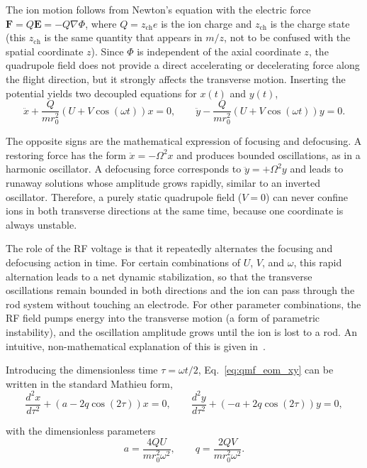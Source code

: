 \documentclass[a4paper]{article}
\begin{document}
The ion motion follows from Newton's equation with the electric force $\bm{F}=Q\bm{E}=-Q\nabla\Phi$, where $Q=z_{\mathrm{ch}}e$ is the ion charge and $z_{\mathrm{ch}}$ is the charge state (this $z_{\mathrm{ch}}$ is the same quantity that appears in $m/z$, not to be confused with the spatial coordinate $z$).
Since $\Phi$ is independent of the axial coordinate $z$, the quadrupole field does not provide a direct accelerating or decelerating force along the flight direction, but it strongly affects the transverse motion.
Inserting the potential yields two decoupled equations for $x(t)$ and $y(t)$,
\begin{equation}
  \ddot{x}+\frac{Q}{m r_0^2}\left(U+V\cos(\omega t)\right)x=0,
  \qquad
  \ddot{y}-\frac{Q}{m r_0^2}\left(U+V\cos(\omega t)\right)y=0.
  \label{eq:qmf_eom_xy}
\end{equation}

The opposite signs are the mathematical expression of focusing and defocusing.
A restoring force has the form $\ddot{x}=-\Omega^2 x$ and produces bounded oscillations, as in a harmonic oscillator.
A defocusing force corresponds to $\ddot{y}=+\Omega^2 y$ and leads to runaway solutions whose amplitude grows rapidly, similar to an inverted oscillator.
Therefore, a purely static quadrupole field ($V=0$) can never confine ions in both transverse directions at the same time, because one coordinate is always unstable.

The role of the RF voltage is that it repeatedly alternates the focusing and defocusing action in time.
For certain combinations of $U$, $V$, and $\omega$, this rapid alternation leads to a net dynamic stabilization, so that the transverse oscillations remain bounded in both directions and the ion can pass through the rod system without touching an electrode.
For other parameter combinations, the RF field pumps energy into the transverse motion (a form of parametric instability), and the oscillation amplitude grows until the ion is lost to a rod.
An intuitive, non-mathematical explanation of this is given in~\cite{nizkorodov_qms_youtube_2009}.

Introducing the dimensionless time $\tau=\omega t/2$, Eq.~\eqref{eq:qmf_eom_xy} can be written in the standard Mathieu form,
\begin{equation}
  \frac{d^2 x}{d\tau^2}+\left(a-2q\cos(2\tau)\right)x=0,
  \qquad
  \frac{d^2 y}{d\tau^2}+\left(-a+2q\cos(2\tau)\right)y=0,
  \label{eq:mathieu_xy}
\end{equation}

with the dimensionless parameters
\begin{equation}
  a=\frac{4QU}{m r_0^2\omega^2},
  \qquad
  q=\frac{2QV}{m r_0^2\omega^2}.
  \label{eq:mathieu_aq}
\end{equation}
\end{document}
